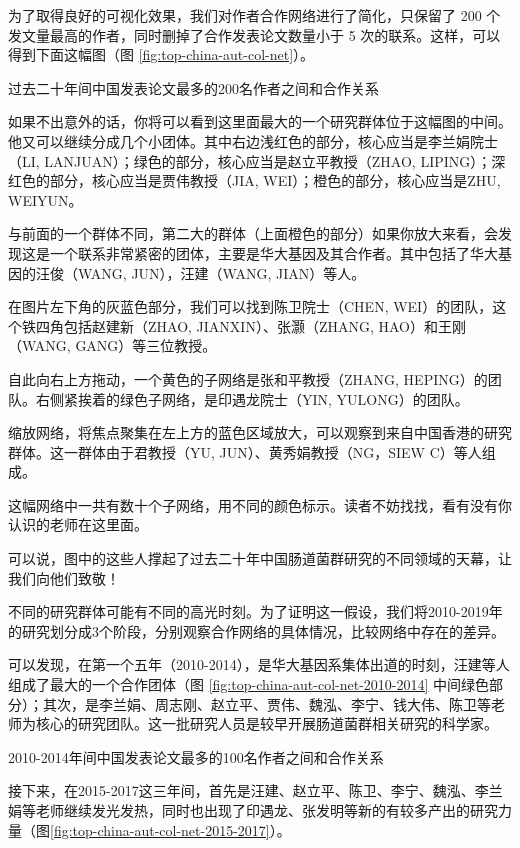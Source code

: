 \documentclass[]{ctexbook}
\begin{document}
为了取得良好的可视化效果，我们对作者合作网络进行了简化，只保留了 200 个发文量最高的作者，同时删掉了合作发表论文数量小于 5 次的联系。这样，可以得到下面这幅图（图 \ref{fig:top-china-aut-col-net}）。

\hypertarget{htmlwidget-c851239bc4cc8b62a35f}{}

\label{fig:top-china-aut-col-net}过去二十年间中国发表论文最多的200名作者之间和合作关系

如果不出意外的话，你将可以看到这里面最大的一个研究群体位于这幅图的中间。他又可以继续分成几个小团体。其中右边浅红色的部分，核心应当是李兰娟院士（LI, LANJUAN）；绿色的部分，核心应当是赵立平教授（ZHAO, LIPING）；深红色的部分，核心应当是贾伟教授（JIA, WEI）；橙色的部分，核心应当是ZHU, WEIYUN。

与前面的一个群体不同，第二大的群体（上面橙色的部分）如果你放大来看，会发现这是一个联系非常紧密的团体，主要是华大基因及其合作者。其中包括了华大基因的汪俊（WANG, JUN），汪建（WANG, JIAN）等人。

在图片左下角的灰蓝色部分，我们可以找到陈卫院士（CHEN, WEI）的团队，这个铁四角包括赵建新（ZHAO, JIANXIN）、张灏（ZHANG, HAO）和王刚（WANG, GANG）等三位教授。

自此向右上方拖动，一个黄色的子网络是张和平教授（ZHANG, HEPING）的团队。右侧紧挨着的绿色子网络，是印遇龙院士（YIN, YULONG）的团队。

缩放网络，将焦点聚集在左上方的蓝色区域放大，可以观察到来自中国香港的研究群体。这一群体由于君教授（YU, JUN）、黄秀娟教授（NG，SIEW C）等人组成。

这幅网络中一共有数十个子网络，用不同的颜色标示。读者不妨找找，看有没有你认识的老师在这里面。

可以说，图中的这些人撑起了过去二十年中国肠道菌群研究的不同领域的天幕，让我们向他们致敬！

不同的研究群体可能有不同的高光时刻。为了证明这一假设，我们将2010-2019年的研究划分成3个阶段，分别观察合作网络的具体情况，比较网络中存在的差异。

可以发现，在第一个五年（2010-2014），是华大基因系集体出道的时刻，汪建等人组成了最大的一个合作团体（图 \ref{fig:top-china-aut-col-net-2010-2014} 中间绿色部分）；其次，是李兰娟、周志刚、赵立平、贾伟、魏泓、李宁、钱大伟、陈卫等老师为核心的研究团队。这一批研究人员是较早开展肠道菌群相关研究的科学家。

\hypertarget{htmlwidget-e202d4b4feb684617220}{}

\label{fig:top-china-aut-col-net-2010-2014}2010-2014年间中国发表论文最多的100名作者之间和合作关系

接下来，在2015-2017这三年间，首先是汪建、赵立平、陈卫、李宁、魏泓、李兰娟等老师继续发光发热，同时也出现了印遇龙、张发明等新的有较多产出的研究力量（图\ref{fig:top-china-aut-col-net-2015-2017}）。
\end{document}
